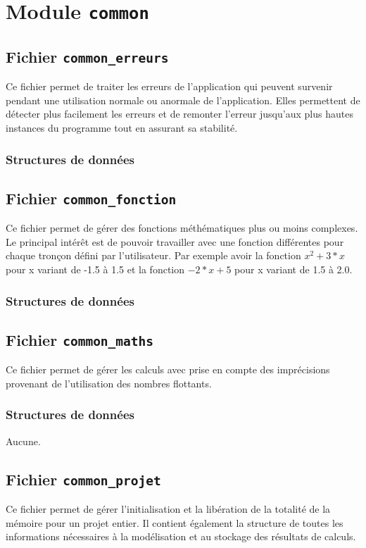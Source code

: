 \documentclass{article}
\begin{document}
\section{Module {\texttt{common}}}
\subsection{Fichier {\texttt{common\_erreurs}}}
Ce fichier permet de traiter les erreurs de l'application qui peuvent survenir pendant une utilisation normale ou anormale de l'application. Elles permettent de détecter plus facilement les erreurs et de remonter l'erreur jusqu'aux plus hautes instances du programme tout en assurant sa stabilité.
\subsubsection{Structures de données}
\subsection{Fichier {\texttt{common\_fonction}}}
Ce fichier permet de gérer des fonctions méthématiques plus ou moins complexes. Le principal intérêt est de pouvoir travailler avec une fonction différentes pour chaque tronçon défini par l'utilisateur. Par exemple avoir la fonction $x^2+3*x$ pour x variant de -1.5 à 1.5 et la fonction $-2*x+5$ pour x variant de 1.5 à 2.0.
\subsubsection{Structures de données}


\subsection{Fichier {\texttt{common\_maths}}}
Ce fichier permet de gérer les calculs avec prise en compte des imprécisions provenant de l'utilisation des nombres flottants.
\subsubsection{Structures de données}
Aucune.

\subsection{Fichier {\texttt{common\_projet}}}
Ce fichier permet de gérer l'initialisation et la libération de la totalité de la mémoire pour un projet entier. Il contient également la structure de toutes les informations nécessaires à la modélisation et au stockage des résultats de calculs.
\end{document}
